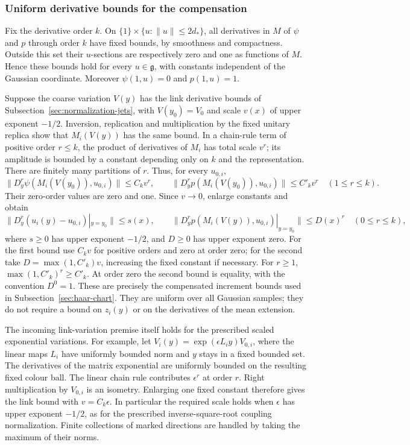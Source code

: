 \subsubsection{Uniform derivative bounds for the compensation}
Fix the derivative order $k$. On
$\{1\}\times\{u:\|u\|\le2d_*\}$, all derivatives in $M$ of
$\psi$ and $p$ through order $k$ have fixed bounds, by smoothness and
compactness. Outside this set their $u$-sections are respectively
zero and one as functions of $M$. Hence these bounds hold for every
$u\in\mathfrak g$, with constants independent of the Gaussian
coordinate. Moreover $\psi(1,u)=0$ and $p(1,u)=1$.

Suppose the coarse variation $V(y)$ has the link derivative bounds
of Subsection~\ref{sec:normalization-jets}, with $V(y_0)=V_0$ and
scale $v(x)$ of upper exponent $-1/2$. Inversion, replication and
multiplication by the fixed unitary replica show that $M_i(V(y))$
has the same bound. In a chain-rule term of positive order $r\le k$,
the product of derivatives of $M_i$ has total scale $v^r$; its
amplitude is bounded by a constant depending only on $k$ and the
representation. There are finitely many partitions of $r$. Thus,
for every $u_{0,i}$,
\[
 \|D^r_y\psi(M_i(V(y_0)),u_{0,i})\|\le C_kv^r,
 \qquad
 \|D^r_y p(M_i(V(y_0)),u_{0,i})\|\le C'_kv^r
 \quad(1\le r\le k).
\]
Their zero-order values are zero and one. Since $v\to0$, enlarge
constants and obtain
\begin{equation}\label{eq:compensator-jets}
 \|D^r_y(u_i(y)-u_{0,i})|_{y=y_0}\|\le s(x),\qquad
 \|D^r_y p(M_i(V(y)),u_{0,i})|_{y=y_0}\|\le D(x)^r
 \quad(0\le r\le k),
\end{equation}
where $s\ge0$ has upper exponent $-1/2$, and $D\ge0$ has upper
exponent zero. For the first bound use $C_kv$ for positive orders
and zero at order zero; for the second take
$D=\max(1,C'_k)v$, increasing the fixed constant if necessary.
For $r\ge1$, $\max(1,C'_k)^r\ge C'_k$. At order zero the second
bound is equality, with the convention $D^0=1$.
These are precisely the compensated increment bounds used in
Subsection~\ref{sec:haar-chart}. They are uniform over all Gaussian
samples; they do not require a bound on $z_i(y)$ or on the derivatives
of the mean extension.

The incoming link-variation premise itself holds for the prescribed
scaled exponential variations. For example, let
$V_i(y)=\exp(\epsilon L_i y)V_{0,i}$, where the linear maps
$L_i$ have uniformly bounded norm and $y$ stays in a fixed bounded
set. The derivatives of the matrix exponential are uniformly bounded
on the resulting fixed colour ball. The linear chain rule contributes
$\epsilon^r$ at order $r$. Right multiplication by $V_{0,i}$ is
an isometry. Enlarging one fixed constant therefore gives the link
bound with $v=C_k\epsilon$. In particular the required scale holds
when $\epsilon$ has upper exponent $-1/2$, as for the prescribed
inverse-square-root coupling normalization. Finite collections of
marked directions are handled by taking the maximum of their norms.

